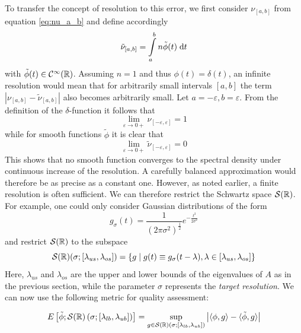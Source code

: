 To transfer the concept of resolution to this error,
we first consider $\nu_{[a, b]}$ from equation \ref{eq:nu_a_b} and define accordingly
\[
\tilde{\nu}_{[a, b]} = \int\limits_a^b n \tilde{\phi}(t) \;\mathrm{d}t
\]
with $\tilde{\phi}(t) \in \mathcal{C}^{\infty}(\mathbb{R})$.
Assuming $n = 1$ and thus $\phi(t) = \delta(t)$,
an infinite resolution would mean that for arbitrarily small intervals $[a, b]$ the term $\left| \nu_{[a, b]} - \tilde{\nu}_{[a, b]} \right|$ also becomes arbitrarily small.
Let $a = -\varepsilon, b = \varepsilon$.
From the definition of the $\delta$-function it follows that
$$\lim \limits_{\varepsilon \to 0+} \nu_{[-\varepsilon, \varepsilon]} = 1$$
while for smooth functions $\tilde{\phi}$ it is clear that
$$\lim \limits_{\varepsilon \to 0+} \tilde{\nu}_{[-\varepsilon, \varepsilon]} = 0$$
This shows that no smooth function converges to the spectral density under continuous increase of the resolution.
A carefully balanced approximation would therefore be as precise as a constant one.
However, as noted earlier,
a finite resolution is often sufficient.
We can therefore restrict the Schwartz space $\mathcal{S}(\mathbb{R})$.
For example, one could only consider Gaussian distributions of the form
$$g_{\sigma}(t) = \frac{1}{(2\pi\sigma^2)^\frac{1}{2}}e^{-\frac{t^2}{2\sigma^2}}$$
and restrict $\mathcal{S}(\mathbb{R})$ to the subspace
$$\mathcal{S}(\mathbb{R})(\sigma;[\lambda_{us}, \lambda_{os}]) = \left\{ g \mid g(t) \equiv g_{\sigma}(t - \lambda), \lambda \in [\lambda_{us}, \lambda_{os}] \right\}$$
Here, $\lambda_{us}$ and $\lambda_{os}$ are the upper and lower bounds of the eigenvalues of $A$ as in the previous section,
while the parameter $\sigma$ represents the \emph{target resolution}.
We can now use the following metric for quality assessment:

\begin{equation} \label{eq:error}
    E\left[\tilde{\phi};\mathcal{S}(\mathbb{R})\left(\sigma; \left[\lambda_{lb}, \lambda_{ub} \right] \right)\right] = \sup_{g \in \mathcal{S}(\mathbb{R})(\sigma;[\lambda_{lb}, \lambda_{ub}])} \left| \langle \phi, g \rangle - \langle \tilde{\phi}, g \rangle \right|
\end{equation}

